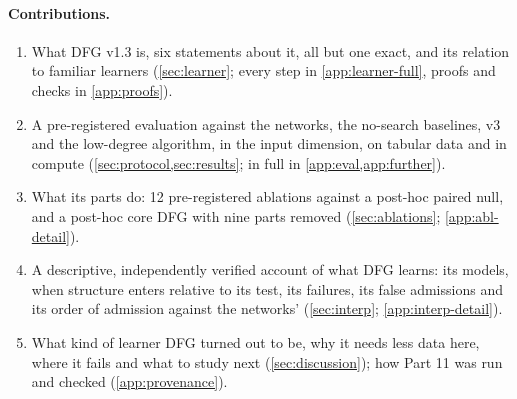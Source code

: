 \paragraph{Contributions.}
\begin{enumerate}
\item What DFG v1.3 is, six statements about it, all but one exact, and its relation to familiar learners (\cref{sec:learner}; every step in \cref{app:learner-full}, proofs and checks in \cref{app:proofs}).
\item A pre-registered evaluation against the networks, the no-search baselines, v3 and the low-degree algorithm, in the input dimension, on tabular data and in compute (\cref{sec:protocol,sec:results}; in full in \cref{app:eval,app:further}).
\item What its parts do: 12 pre-registered ablations against a post-hoc paired null, and a post-hoc core DFG with nine parts removed (\cref{sec:ablations}; \cref{app:abl-detail}).
\item A descriptive, independently verified account of what DFG learns: its models, when structure enters relative to its test, its failures, its false admissions and its order of admission against the networks' (\cref{sec:interp}; \cref{app:interp-detail}).
\item What kind of learner DFG turned out to be, why it needs less data here, where it fails and what to study next (\cref{sec:discussion}); how Part 11 was run and checked (\cref{app:provenance}).
\end{enumerate}
